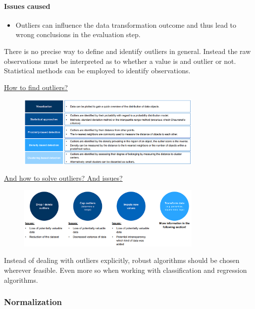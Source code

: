 \documentclass[12pt, a4paper, oneside, justified]{article}
\begin{document}
\paragraph*{Issues caused}
\begin{itemize}
    \item Outliers can influence the data transformation outcome and thus lead to wrong conclusions in the evaluation step.
\end{itemize}

There is no precise way to define and identify outliers in general. Instead the raw observations must be interpreted as to whether a value is and outlier or not. Statistical methods can be employed to identify observations.

\underline{How to find outliers?}

\begin{figure}[!h]
    \centering
    \includegraphics[width=0.8\textwidth]{../img/3-22.png}
\end{figure}

\underline{And how to solve outliers? And issues?}

\begin{figure}[!h]
    \centering
    \includegraphics[width=0.8\textwidth]{../img/3-23.png}
\end{figure}
Instead of dealing with outliers explicitly, robust algorithms should be chosen wherever feasible. Even more so when working with
classification and regression algorithms.

\subsubsection{Normalization}
\end{document}
